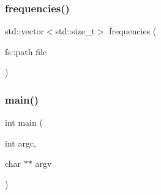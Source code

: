 \subsubsection{\texorpdfstring{frequencies()}{frequencies()}}
{\footnotesize\ttfamily std\+::vector$<$std\+::size\+\_\+t$>$ frequencies (\begin{DoxyParamCaption}\item[{fs\+::path}]{file }\end{DoxyParamCaption})}

\mbox{\label{irk-uncompress_8cpp_a3c04138a5bfe5d72780bb7e82a18e627}} 
\subsubsection{\texorpdfstring{main()}{main()}}
{\footnotesize\ttfamily int main (\begin{DoxyParamCaption}\item[{int}]{argc,  }\item[{char $\ast$$\ast$}]{argv }\end{DoxyParamCaption})}

